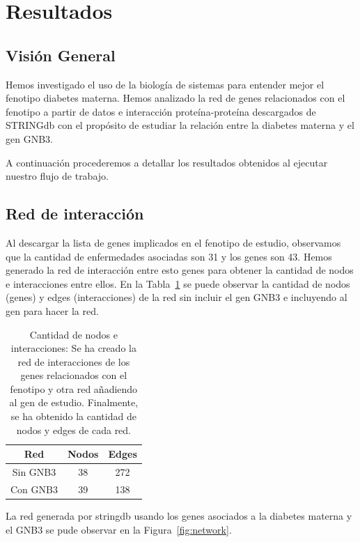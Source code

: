 
\section{Resultados}

\subsection{Visión General}

Hemos investigado el uso de la biología de sistemas para entender mejor el fenotipo diabetes materna. Hemos analizado la red de genes relacionados con el fenotipo a partir de datos e interacción proteína-proteína descargados de STRINGdb con el propósito de estudiar la relación entre la diabetes materna y el gen GNB3.

A continuación procederemos a detallar los resultados obtenidos al ejecutar nuestro flujo de trabajo.

\subsection{Red de interacción}

Al descargar la lista de genes implicados en el fenotipo de estudio, observamos que la cantidad de enfermedades asociadas son 31 y los genes son 43. Hemos generado la red de interacción entre esto genes para obtener la cantidad de nodos e interacciones entre ellos. En la Tabla~\ref{table:nodes_edges_count} se puede observar la cantidad de nodos (genes) y edges (interacciones) de la red sin incluir el gen GNB3 e incluyendo al gen para hacer la red.


\begin{table}[h]
	\centering
	\begin{tabular}{|c|c|c|}
		\hline
		Red & Nodos & Edges \\ \hline
		Sin GNB3 & 38    & 272   \\ \hline
		Con GNB3 & 39    & 138  \\ \hline
	\end{tabular}
	\caption{Cantidad de nodos e interacciones: Se ha creado la red de interacciones de los genes relacionados con el fenotipo y otra red añadiendo al gen de estudio. Finalmente, se ha obtenido la cantidad de nodos y edges de cada red.}
	\label{table:nodes_edges_count}
\end{table}

La red generada por stringdb usando los genes asociados a la diabetes materna y el GNB3 se pude observar en la Figura~\ref{fig:network}.

